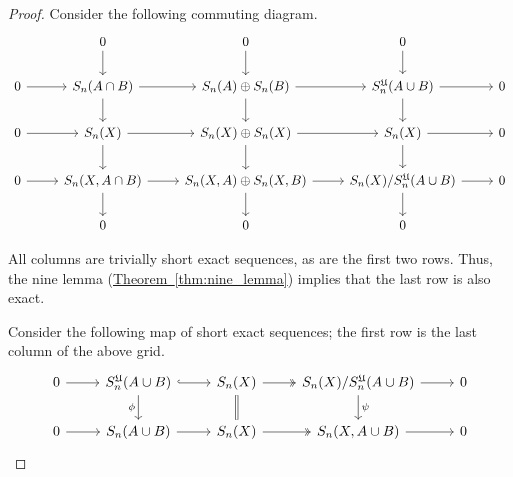 \documentclass[main.tex]{subfiles}
\begin{document}
\begin{proof}
  Consider the following commuting diagram.
  \begin{equation*}
    \begin{tikzcd}
      & 0
      \arrow[d]
      & 0
      \arrow[d]
      & 0
      \arrow[d]
      \\
      0
      \arrow[r]
      & S_{n}(A \cap B)
      \arrow[r]
      \arrow[d]
      & S_{n}(A) \oplus S_{n}(B)
      \arrow[r]
      \arrow[d]
      & S_{n}^{\mathfrak{U}}(A \cup B)
      \arrow[r]
      \arrow[d]
      & 0
      \\
      0
      \arrow[r]
      & S_{n}(X)
      \arrow[r]
      \arrow[d]
      & S_{n}(X) \oplus S_{n}(X)
      \arrow[r]
      \arrow[d]
      & S_{n}(X)
      \arrow[r]
      \arrow[d]
      & 0
      \\
      0
      \arrow[r]
      & S_{n}(X, A \cap B)
      \arrow[r]
      \arrow[d]
      & S_{n}(X, A) \oplus S_{n}(X, B)
      \arrow[r]
      \arrow[d]
      & S_{n}(X) / S_{n}^{\mathfrak{U}}(A \cup B)
      \arrow[r]
      \arrow[d]
      & 0
      \\
      & 0
      & 0
      & 0
    \end{tikzcd}
  \end{equation*}

  All columns are trivially short exact sequences, as are the first two rows. Thus, the nine lemma (\hyperref[thm:nine_lemma]{Theorem~\ref*{thm:nine_lemma}}) implies that the last row is also exact.

  Consider the following map of short exact sequences; the first row is the last column of the above grid.
  \begin{equation*}
    \begin{tikzcd}
      0
      \arrow[r]
      & S_{n}^{\mathfrak{U}}(A \cup B)
      \arrow[r, hook]
      \arrow[d, swap, "\phi"]
      & S_{n}(X)
      \arrow[r, two heads]
      \arrow[d, equals]
      & S_{n}(X)/S_{n}^{\mathfrak{U}}(A \cup B)
      \arrow[r]
      \arrow[d, "\psi"]
      & 0
      \\
      0
      \arrow[r]
      & S_{n}(A \cup B)
      \arrow[r, right]
      & S_{n}(X)
      \arrow[r, two heads]
      & S_{n}(X, A \cup B)
      \arrow[r]
      & 0
    \end{tikzcd}
  \end{equation*}


\end{proof}
\end{document}
